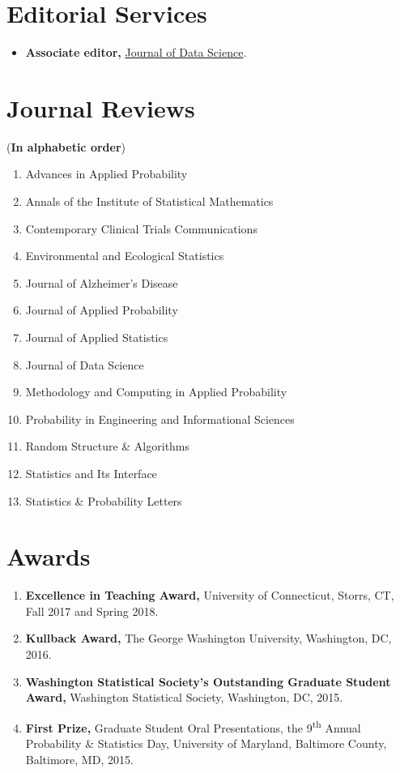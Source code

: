 \documentclass[margin]{res}
\begin{document}
\begin{resume}
\section{Editorial Services}
\begin{itemize}
	\item \textbf{Associate editor,} 
	\href{https://jds-online.org/journal/JDS}{Journal of Data 
	Science}.
\end{itemize}

\section{Journal Reviews}
({\bf In alphabetic order})
\begin{enumerate}
	\item Advances in Applied Probability
	\item Annals of the Institute of Statistical Mathematics
	\item Contemporary Clinical Trials Communications
	\item Environmental and Ecological Statistics
	\item Journal of Alzheimer's Disease
	\item Journal of Applied Probability
	\item Journal of Applied Statistics 
	\item Journal of Data Science
	\item Methodology and Computing in Applied Probability
	\item Probability in Engineering and Informational Sciences
	\item Random Structure \& Algorithms
	\item Statistics and Its Interface
	\item Statistics \& Probability Letters
\end{enumerate}

\section{Awards}
\begin{enumerate}
	\item {\bf Excellence in Teaching Award,} University of Connecticut, Storrs, CT, Fall 2017 and Spring 2018.
	\item {\bf Kullback Award,} The George Washington University, Washington, DC, 2016.
	\item {\bf Washington Statistical Society's Outstanding Graduate Student Award,} Washington Statistical Society, Washington, DC, 2015.
	\item {\bf First Prize,} Graduate Student Oral Presentations, the 9\textsuperscript{th} Annual Probability \& Statistics Day,  University of Maryland, Baltimore County, Baltimore, MD, 2015.
\end{enumerate}
\end{resume} 
\end{document}
